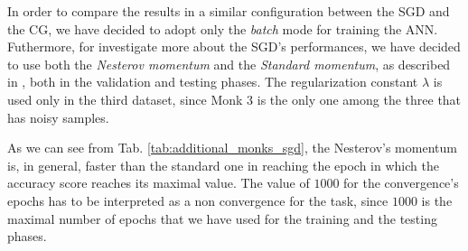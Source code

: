             In order to compare the results in a similar configuration between the SGD and the CG, we have decided to
            adopt only the \textit{batch} mode for training the ANN.
            Futhermore, for investigate more about the SGD's performances, we have decided to use both the
            \textit{Nesterov momentum} and the \textit{Standard momentum}, as described in
            \cite{Goodfellow-et-al-2016,Sutskever:2013:IIM:3042817.3043064}, both in the validation and testing phases.
            The regularization constant $\lambda$ is used only in the third dataset, since Monk 3 is the only one among
            the three that has noisy samples.

            \begin{table}[H]
                \centering
                \begin{subtable}{\textwidth}
                \end{subtable}
                \caption{Additional statistics for the Stochastic Gradient Descent.}
                \label{tab:additional_monks_sgd}
            \end{table}

            As we can see from Tab. \ref{tab:additional_monks_sgd}, the Nesterov's momentum is, in general, faster
            than the standard one in reaching the epoch in which the accuracy score reaches its maximal value. The
            value of $1000$ for the convergence's epochs has to be interpreted as a non convergence for the task,
            since $1000$ is the maximal number of epochs that we have used for the training and the testing phases.

